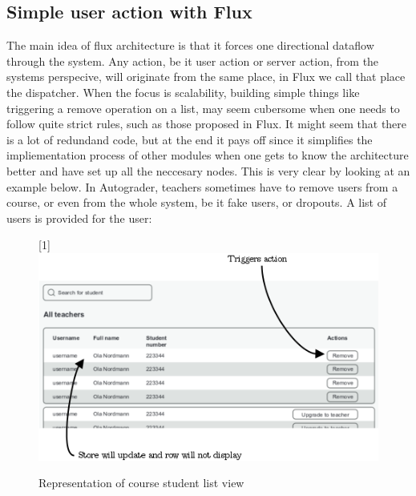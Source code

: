 \subsection{Simple user action with Flux}\label{sec:simplefluxexample}
The main idea of flux architecture is that it forces one directional dataflow through the system. Any action, be it user action or server action, from the systems perspecive, will originate from the same place, in Flux we call that place the dispatcher. When the focus is scalability, building simple things like triggering a remove operation on a list, may seem cubersome when one needs to follow quite strict rules, such as those proposed in Flux. It might seem that there is a lot of redundand code, but at the end it pays off since it simplifies the impliementation process of other modules when one gets to know the architecture better and have set up all the neccesary nodes. This is very clear by looking at an example below. In Autograder, teachers sometimes have to remove users from a course, or even from the whole system, be it fake users, or dropouts. A list of users is provided for the user:
\begin{figure}[h]
  \scalebox{1}[1]{{\includegraphics[width=1\linewidth]{graphics/simpleremoveuser.png}}}
  \caption{Representation of course student list view}
  \label{fig:simpleremoveuser}
\end{figure}

